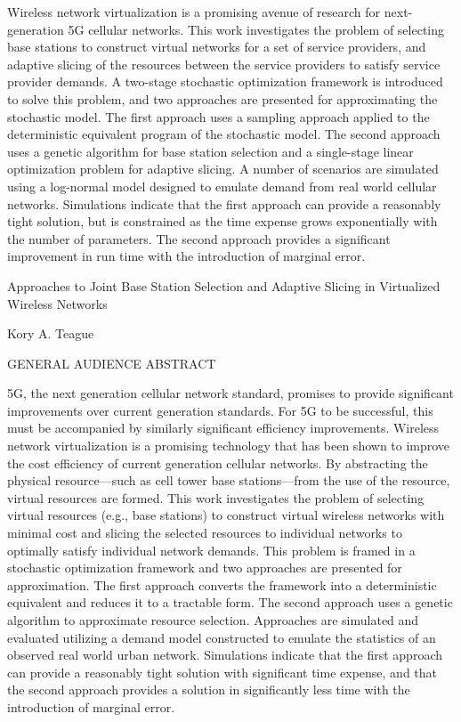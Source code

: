 \documentclass[12pt,dvipsnames]{report}
\begin{document}
Wireless network virtualization is a promising avenue of research for next-generation 5G cellular networks.  This work investigates the problem of selecting base stations to construct virtual networks for a set of service providers, and adaptive slicing of the resources between the service providers to satisfy service provider demands.  A two-stage stochastic optimization framework is introduced to solve this problem, and two approaches are presented for approximating the stochastic model.  The first approach uses a sampling approach applied to the deterministic equivalent program of the stochastic model.  The second approach uses a genetic algorithm for base station selection and a single-stage linear optimization problem for adaptive slicing.  A number of scenarios are simulated using a log-normal model designed to emulate demand from real world cellular networks.  Simulations indicate that the first approach can provide a reasonably tight solution, but is constrained as the time expense grows exponentially with the number of parameters.  The second approach provides a significant improvement in run time with the introduction of marginal error.

\pagebreak

\thispagestyle{empty}
\begin{center}

{\large Approaches to Joint Base Station Selection and Adaptive Slicing in Virtualized Wireless Networks}

Kory A. Teague

GENERAL AUDIENCE ABSTRACT

\end{center}

5G, the next generation cellular network standard, promises to provide significant improvements over current generation standards.  For 5G to be successful, this must be accompanied by similarly significant efficiency improvements.  Wireless network virtualization is a promising technology that has been shown to improve the cost efficiency of current generation cellular networks.  By abstracting the physical resource---such as cell tower base stations---from the use of the resource, virtual resources are formed.  This work investigates the problem of selecting virtual resources (e.g., base stations) to construct virtual wireless networks with minimal cost and slicing the selected resources to individual networks to optimally satisfy individual network demands.  This problem is framed in a stochastic optimization framework and two approaches are presented for approximation.  The first approach converts the framework into a deterministic equivalent and reduces it to a tractable form.  The second approach uses a genetic algorithm to approximate resource selection.  Approaches are simulated and evaluated utilizing a demand model constructed to emulate the statistics of an observed real world urban network.  Simulations indicate that the first approach can provide a reasonably tight solution with significant time expense, and that the second approach provides a solution in significantly less time with the introduction of marginal error.
\end{document}

